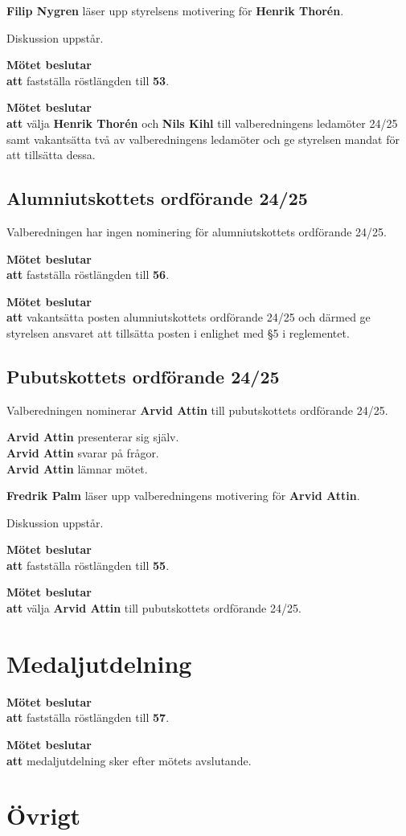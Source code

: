 \documentclass{datateknologsektionen-document}
\newcommand{\ind}{\hspace*{2em}}
\newcommand{\motetbeslutar}{\textbf{Mötet beslutar}}
\newcommand{\att}{\\\ind\textbf{att}}
\newcommand{\rostlangd}[1]{\motetbeslutar\att{} fastställa röstlängden till \textbf{#1}.}
\begin{document}
\textbf{Filip Nygren} läser upp styrelsens motivering för \textbf{Henrik Thorén}.

Diskussion uppstår.

\rostlangd{53}

\motetbeslutar\att{} välja \textbf{Henrik Thorén} och \textbf{Nils Kihl} till valberedningens ledamöter 24/25 samt vakantsätta två av valberedningens ledamöter och ge styrelsen mandat för att tillsätta dessa.

\subsection{Alumniutskottets ordförande 24/25}

Valberedningen har ingen nominering för alumniutskottets ordförande 24/25.

\pagebreak

\rostlangd{56}

\motetbeslutar\att{} vakantsätta posten alumniutskottets ordförande 24/25 och därmed ge styrelsen ansvaret att tillsätta posten i enlighet med §5 i reglementet.

\subsection{Pubutskottets ordförande 24/25}

Valberedningen nominerar \textbf{Arvid Attin} till pubutskottets ordförande 24/25.

\textbf{Arvid Attin} presenterar sig själv.\\
\textbf{Arvid Attin} svarar på frågor.\\
\textbf{Arvid Attin} lämnar mötet.

\textbf{Fredrik Palm} läser upp valberedningens motivering för \textbf{Arvid Attin}.

Diskussion uppstår.

\rostlangd{55}

\motetbeslutar\att{} välja \textbf{Arvid Attin} till pubutskottets ordförande 24/25.

\section{Medaljutdelning}

\rostlangd{57}

\motetbeslutar\att{} medaljutdelning sker efter mötets avslutande.

\section{Övrigt}
\end{document}
